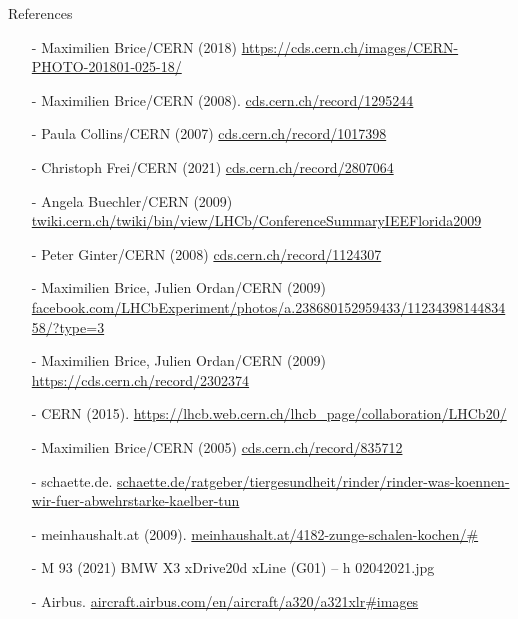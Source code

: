 \begin{frame}{References}\scriptsize
\begin{itemize}
\item[-] Maximilien Brice/CERN (2018) \url{https://cds.cern.ch/images/CERN-PHOTO-201801-025-18/} 
\item[-] Maximilien Brice/CERN (2008). \url{cds.cern.ch/record/1295244}
\item[-] Paula Collins/CERN (2007)  \url{cds.cern.ch/record/1017398}
\item[-] Christoph Frei/CERN (2021)  \url{cds.cern.ch/record/2807064}
\item[-] Angela Buechler/CERN (2009)  \url{twiki.cern.ch/twiki/bin/view/LHCb/ConferenceSummaryIEEFlorida2009}
\item[-] Peter Ginter/CERN (2008) \url{cds.cern.ch/record/1124307}
\item[-] Maximilien Brice, Julien Ordan/CERN (2009)  \url{facebook.com/LHCbExperiment/photos/a.238680152959433/1123439814483458/?type=3}
\item[-] Maximilien Brice, Julien Ordan/CERN (2009)  \url{https://cds.cern.ch/record/2302374}
\item[-] CERN (2015). \url{https://lhcb.web.cern.ch/lhcb_page/collaboration/LHCb20/ }
\item[-] Maximilien Brice/CERN (2005)  \url{cds.cern.ch/record/835712}
\item[-] schaette.de. \url{schaette.de/ratgeber/tiergesundheit/rinder/rinder-was-koennen-wir-fuer-abwehrstarke-kaelber-tun}
\item[-] meinhaushalt.at (2009). \url{meinhaushalt.at/4182-zunge-schalen-kochen/#}
\item[-] M 93 (2021) BMW X3 xDrive20d xLine (G01) – h 02042021.jpg
\item[-] Airbus. \url{aircraft.airbus.com/en/aircraft/a320/a321xlr#images}

\end{itemize}
\end{frame}
